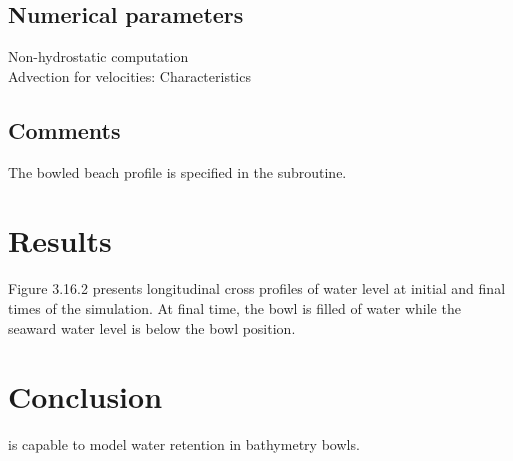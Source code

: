 \subsection{Numerical parameters}
%
Non-hydrostatic computation\\
Advection for velocities: Characteristics
%
\subsection{Comments}
%
The bowled beach profile is specified in the 
subroutine.
%
%
%
\section{Results}
%
Figure 3.16.2 presents longitudinal cross profiles of water level at
initial and final times of the simulation.
At final time, the bowl is filled of water while the seaward water level
is below the bowl position.
%
\section{Conclusion}
%
 is capable to model water retention in bathymetry bowls.
%
%

